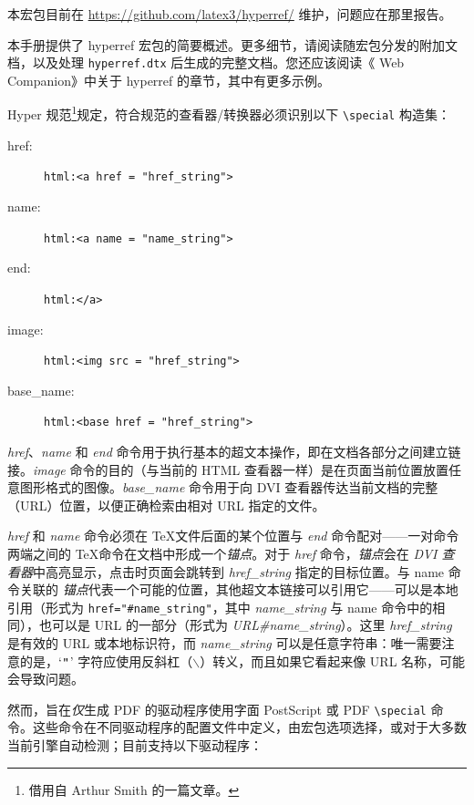 \documentclass{article}
\newcommand*{\cs}[1]{%
  \texttt{\textbackslash #1}%
}
\newcommand*{\xpackage}[1]{\textsf{#1}}
\begin{document}
本宏包目前在 \url{https://github.com/latex3/hyperref/} 维护，问题应在那里报告。

本手册提供了 \xpackage{hyperref} 宏包的简要概述。更多细节，请阅读随宏包分发的附加文档，以及处理 \texttt{hyperref.dtx} 后生成的完整文档。您还应该阅读《 Web Companion》中关于 \xpackage{hyperref} 的章节，其中有更多示例。

Hyper 规范\footnote{借用自 Arthur Smith 的一篇文章。}规定，符合规范的查看器/转换器必须识别以下 \cs{special} 构造集：

\begin{description}
\item[href:] \verb|html:<a href = "href_string">|
\item[name:] \verb|html:<a name = "name_string">|
\item[end:] \verb|html:</a>|
\item[image:] \verb|html:<img src = "href_string">|
\item[base\_name:] \verb|html:<base href = "href_string">|
\end{description}

\emph{href}、\emph{name} 和 \emph{end} 命令用于执行基本的超文本操作，即在文档各部分之间建立链接。\emph{image} 命令的目的（与当前的 HTML 查看器一样）是在页面当前位置放置任意图形格式的图像。\emph{base\_name} 命令用于向 DVI 查看器传达当前文档的完整（URL）位置，以便正确检索由相对 URL 指定的文件。

\emph{href} 和 \emph{name} 命令必须在 \TeX 文件后面的某个位置与 \emph{end} 命令配对——一对命令两端之间的 \TeX 命令在文档中形成一个\emph{锚点}。对于 \emph{href} 命令，\emph{锚点}会在 \emph{DVI 查看器}中高亮显示，点击时页面会跳转到 \emph{href\_string} 指定的目标位置。与 name 命令关联的 \emph{锚点}代表一个可能的位置，其他超文本链接可以引用它——可以是本地引用（形式为 \verb|href="#name_string"|，其中 \emph{name\_string} 与 name 命令中的相同），也可以是 URL 的一部分（形式为 \emph{URL\#name\_string}）。这里 \emph{href\_string} 是有效的 URL 或本地标识符，而 \emph{name\_string} 可以是任意字符串：唯一需要注意的是，`$\verb|"|$' 字符应使用反斜杠（$\backslash$）转义，而且如果它看起来像 URL 名称，可能会导致问题。

然而，旨在\emph{仅}生成 PDF 的驱动程序使用字面 PostScript 或 PDF \verb|\special| 命令。这些命令在不同驱动程序的配置文件中定义，由宏包选项选择，或对于大多数当前引擎自动检测；目前支持以下驱动程序：
\end{document}
